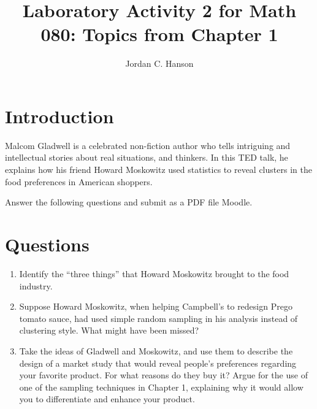 \documentclass{article}
\begin{document}
\title{Laboratory Activity 2 for Math 080: Topics from Chapter 1}
\author{Jordan C. Hanson}
\maketitle

\section{Introduction}

Malcom Gladwell is a celebrated non-fiction author who tells intriguing and intellectual stories about real situations, and thinkers.  In this TED talk, he explains how his friend Howard Moskowitz used statistics to reveal clusters in the food preferences in American shoppers.

Answer the following questions and submit as a PDF file Moodle.

\section{Questions}

\begin{enumerate}
\item Identify the ``three things'' that Howard Moskowitz brought to the food industry. \\ \vspace{3cm}
\item Suppose Howard Moskowitz, when helping Campbell's to redesign Prego tomato sauce, had used simple random sampling in his analysis instead of clustering style.  What might have been missed? \\ \vspace{3 cm}
\item Take the ideas of Gladwell and Moskowitz, and use them to describe the design of a market study that would reveal people's preferences regarding your favorite product.  For what reasons do they buy it?  Argue for the use of one of the sampling techniques in Chapter 1, explaining why it would allow you to differentiate and enhance your product.
\end{enumerate}
\end{document}
